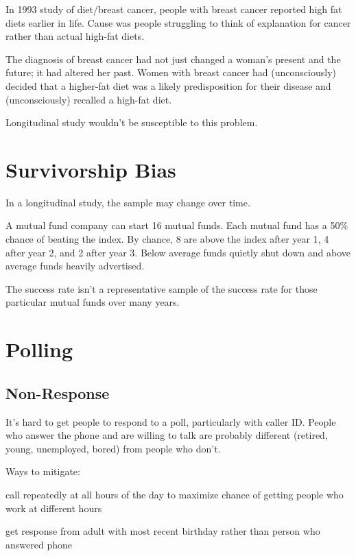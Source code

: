 \documentclass[landscape]{exam}
\begin{document}
  In 1993 study of diet/breast cancer, people with breast cancer reported high
  fat diets earlier in life.  Cause was people struggling to think of
  explanation for cancer rather than actual high-fat diets.

  \begin{em}
    The diagnosis of breast cancer had not just changed a woman’s present and the
    future; it had altered her past. Women with breast cancer had (unconsciously)
    decided that a higher-fat diet was a likely predisposition for their disease
    and (unconsciously) recalled a high-fat diet.
  \end{em}

  Longitudinal study wouldn't be susceptible to this problem.

  \section{Survivorship Bias}

  In a longitudinal study, the sample may change over time.

  A mutual fund company can start 16 mutual funds. Each mutual fund has a
  50\% chance of beating the index. By chance, 8 are above
  the index after year 1, 4 after year 2, and 2 after year 3.  Below average
  funds quietly shut down and above average funds heavily advertised.

  The success rate isn't a representative sample of the success
  rate for those particular mutual funds over many years.

  \section{Polling}

  \subsection{Non-Response}
  It's hard to get people to respond to a poll, particularly with caller ID\@.
  People who answer the phone and are willing to talk are probably different
  (retired, young, unemployed, bored) from people who don't.

  Ways to mitigate:
  \begin{itemize*}
    \item call repeatedly at all hours of the day to maximize chance of getting
      people who work at different hours

    \item get response from adult with most recent birthday rather than person
      who answered phone
  \end{itemize*}
\end{document}
